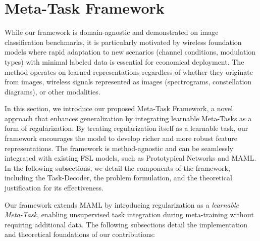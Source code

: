 




\section{Meta-Task Framework}\label{sec:approach}

While our framework is domain-agnostic and demonstrated on image classification benchmarks, it is particularly motivated by wireless foundation models where rapid adaptation to new scenarios (channel conditions, modulation types) with minimal labeled data is essential for economical deployment. The method operates on learned representations regardless of whether they originate from images, wireless signals represented as images (spectrograms, constellation diagrams), or other modalities.

In this section, we introduce our proposed Meta-Task Framework, a novel approach that enhances generalization by integrating learnable Meta-Tasks as a form of regularization. By treating regularization itself as a learnable task, our framework encourages the model to develop richer and more robust feature representations. The framework is method-agnostic and can be seamlessly integrated with existing FSL models, such as Prototypical Networks and MAML. In the following subsections, we detail the components of the framework, including the Task-Decoder, the problem formulation, and the theoretical justification for its effectiveness.

Our framework extends MAML \cite{maml} by introducing regularization as a \textit{learnable Meta-Task}, enabling unsupervised task integration during meta-training without requiring additional data. The following subsections detail the implementation and theoretical foundations of our contributions:

